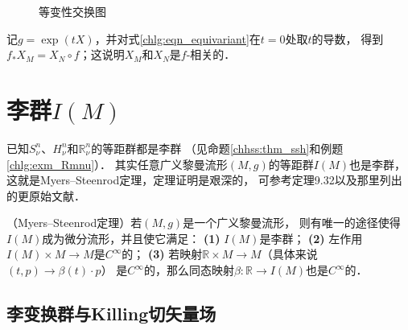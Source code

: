 \begin{figure}[htb]
    \centering
    \caption{等变性交换图}\label{chlg:pic_eqv-exchange}
\end{figure}

记$g=\exp(t X)$，并对式\eqref{chlg:eqn_equivariant}在$t=0$处取$t$的导数，
得到$f_* X_M = X_N \circ f$；这说明$X_M$和$X_N$是$f$-相关的．




\section{李群$I(M)$}\label{chlg:sec_IM}

已知$S^n_\nu$、$H^n_\nu$和$\mathbb{R}^n_\nu$的等距群都是{\kaishu 李群}
（见命题\ref{chhss:thm_ssh}和例题\ref{chlg:exm_Rmnu}）．
其实任意广义黎曼流形$(M,g)$的等距群$I(M)$也是{\kaishu 李群}，
这就是Myers--Steenrod定理，定理证明是艰深的，
可参考\parencite{oneill1983}定理9.32以及那里列出的更原始文献．


\begin{theorem}\label{chlg:thm_ISOM}
    （Myers--Steenrod定理）若$(M,g)$是一个广义黎曼流形，
    则有唯一的途径使得$I(M)$成为微分流形，并且使它满足：
    {\bfseries (1)} $I(M)$是李群；
    {\bfseries (2)} 左作用$I(M)\times M\to M$是$C^\infty$的；
    {\bfseries (3)} 若映射$\mathbb{R}\times M\to M$（具体来说$(t,p)\to \beta(t)\cdot p$）
    是$C^\infty$的，那么同态映射$\beta : \mathbb{R}\to I(M)$也是$C^\infty$的．
\end{theorem}


\subsection{李变换群与Killing切矢量场}\label{chlg:sec_killing}

